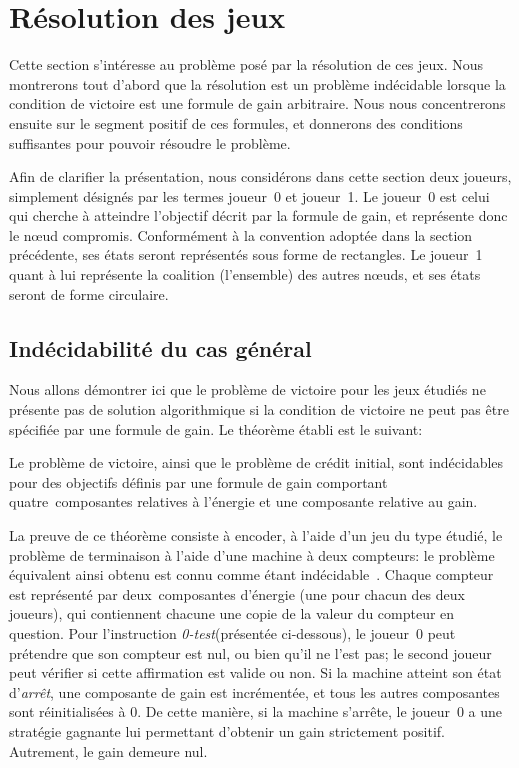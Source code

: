 \section{Résolution des jeux}
\label{tj:sec:algo}

Cette section s'intéresse au problème posé par la résolution de ces jeux.
Nous montrerons tout d'abord que la résolution est un problème indécidable lorsque la condition de victoire est une formule de gain arbitraire.
Nous nous concentrerons ensuite sur le segment positif de ces formules, et donnerons des conditions suffisantes pour pouvoir résoudre le problème.

\newcommand\jo{joueur~0\xspace}
\newcommand\ji{joueur~1\xspace}
Afin de clarifier la présentation, nous considérons dans cette section deux joueurs, simplement désignés par les termes \jo et \ji.
Le \jo est celui qui cherche à atteindre l'objectif décrit par la formule de gain, et représente donc le nœud compromis.
Conformément à la convention adoptée dans la section précédente, ses états seront représentés sous forme de rectangles.
Le \ji quant à lui représente la coalition (l'ensemble) des autres nœuds, et ses états seront de forme circulaire.

\subsection{Indécidabilité du cas général}

Nous allons démontrer ici que le problème de victoire pour les jeux étudiés ne présente pas de solution algorithmique si la condition de victoire ne peut pas être spécifiée par une formule de gain.
Le théorème établi est le suivant:
\begin{theorem}
Le problème de victoire, ainsi que le problème de crédit initial, sont indécidables pour des objectifs définis par une formule de gain comportant quatre~composantes relatives à l'énergie et une composante relative au gain.
\end{theorem}

\newcommand\tjztest{\textit{0-test}\xspace}
\newcommand\tjhalt {\textsf{halte}\xspace}
\newcommand\tjstop {\textsf{arrêt}\xspace}
\newcommand\tjstopq{\textsf{arrêt$'$}\xspace}
\newcommand\tjcheck{\textsf{vérif}\xspace}
La preuve de ce théorème consiste à encoder, à l'aide d'un jeu du type étudié, le problème de terminaison à l'aide d'une machine à deux compteurs: le problème équivalent ainsi obtenu est connu comme étant indécidable~\cite{minsky67}.
Chaque compteur est représenté par deux~composantes d'énergie (une pour chacun des deux joueurs), qui contiennent chacune une copie de la valeur du compteur en question.
Pour l'instruction \tjztest (présentée ci-dessous), le \jo peut prétendre que son compteur est nul, ou bien qu'il ne l'est pas; le second joueur peut vérifier si cette affirmation est valide ou non.
Si la machine atteint son état d'\textit{arrêt}, une composante de gain est incrémentée, et tous les autres composantes sont réinitialisées à $0$.
De cette manière, si la machine s'arrête, le \jo a une stratégie gagnante lui permettant d'obtenir un gain strictement positif.
Autrement, le gain demeure nul.

